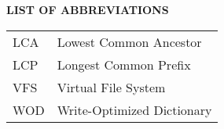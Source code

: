 {}

\begin{center}
\textbf{LIST OF ABBREVIATIONS}
\vspace{16pt}
\end{center}


\noindent
\begin{tabular}{p{0.8in} p{5in}}
LCA     & Lowest Common Ancestor\\
LCP     & Longest Common Prefix\\
VFS     & Virtual File System\\
WOD     & Write-Optimized Dictionary\\
\end{tabular}

\clearpage
